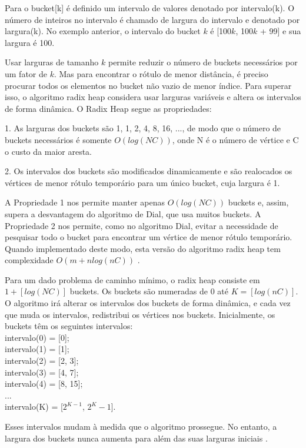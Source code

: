 Para o bucket[k] é definido um intervalo de valores denotado por intervalo(k). O número de inteiros
no intervalo é chamado de largura do intervalo e denotado por largura(k).
No exemplo anterior, o intervalo do bucket $k$ é [100$k$, 100$k$ + 99] e sua largura é 100. 

Usar larguras de tamanho $k$ permite reduzir o número de buckets necessários por um fator de $k$.
Mas para encontrar o rótulo de menor distância, é preciso procurar todos os elementos no bucket não vazio de menor índice.
Para superar isso, o algoritmo radix heap considera usar larguras variáveis e altera os intervalos de forma dinâmica. 
O Radix Heap segue as propriedades:

1. As larguras dos buckets são 1, 1, 2, 4, 8, 16, ..., de modo que o número de buckets necessários é somente $O(log(NC))$,
onde N é o número de vértice e C o custo da maior aresta.

2.  Os intervalos dos buckets são modificados dinamicamente e são realocados os vértices de menor rótulo temporário
para um único bucket, cuja largura é 1.

A Propriedade 1 nos permite manter apenas $O(log(NC))$ buckets e, assim, supera a desvantagem do algoritmo
de Dial, que usa muitos buckets.
A Propriedade 2 nos permite, como no algoritmo Dial, evitar a necessidade de 
pesquisar todo o bucket para encontrar um vértice de menor rótulo temporário. Quando implementado deste modo, esta 
versão do algoritmo radix heap tem complexidade $O(m + nlog(nC))$ \cite{bookahuja}.

Para um dado problema de caminho mínimo, o radix heap consiste em $1 + [log(NC)]$ buckets.
Os buckets são numeradas de $0$ até $K = [log(nC)]$.
O algoritmo irá alterar os intervalos dos buckets de forma dinâmica, e cada vez que muda os intervalos,
redistribui os vértices nos buckets. Inicialmente, os buckets têm os seguintes intervalos:\\
intervalo(0) = [0];\\
intervalo(1) = [1];\\
intervalo(2) = [2, 3];\\
intervalo(3) = [4, 7];\\
intervalo(4) = [8, 15];\\
...\\
intervalo(K) = [$2^{K - 1}$, $2^K - 1$].

Esses intervalos mudam à medida que o algoritmo prossegue. No entanto, a largura dos buckets nunca aumenta
para além das suas larguras iniciais \cite{bookahuja}.

